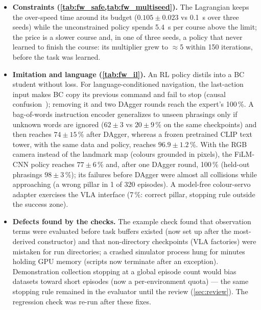 \begin{itemize}
faster than a tuned potential field, which is, however, more reliable (100 vs $89.6\pm2.4$\,\% group success). The potential field's
gains were selected on the training scenario after its first setting failed (0\,\%, 53\,\% collisions).
\item \textbf{Constraints (\cref{tab:fw_safe,tab:fw_multiseed}).} The Lagrangian keeps the over-speed time around its
budget ($0.105\pm0.023$ vs \SI{0.1}{s} over three seeds) while the unconstrained policy spends \SI{5.4}{s} per course
above the limit; the price is a slower course and, in one of three seeds, a policy that never learned to finish the
course: its multiplier grew to $\approx$5 within 150 iterations, before the task was learned.
\item \textbf{Imitation and language (\cref{tab:fw_il}).} An RL policy distils into a BC student without loss. For
language-conditioned navigation, the last-action input makes BC copy its previous command and fail to stop (causal
confusion~\cite{dehaan2019causal}); removing it and two DAgger rounds reach the expert's 100\,\%. A bag-of-words
instruction encoder generalizes to unseen phrasings only if unknown words are ignored ($62\pm3$ vs $20\pm9$\,\% on the
same checkpoints) and then reaches $74\pm15$\,\% after DAgger, whereas a frozen pretrained CLIP text tower, with the
same data and policy, reaches $96.9\pm1.2$\,\%. With the RGB camera instead of the
landmark map (colours grounded in pixels), the FiLM-CNN policy reaches $77\pm6$\,\% and, after one DAgger round,
100\,\% (held-out phrasings $98\pm3$\,\%); its failures before DAgger were almost all collisions while approaching
(a wrong pillar in 1 of 320 episodes). A model-free colour-servo adapter exercises the VLA interface (7\,\%: correct
pillar, stopping rule outside the success zone).
\item \textbf{Defects found by the checks.} The example check found that observation terms were evaluated before
task buffers existed (now set up after the most-derived constructor) and that non-directory checkpoints (VLA
factories) were mistaken for run directories; a crashed simulator process hung for minutes holding GPU memory
(scripts now terminate after an exception). Demonstration collection stopping at a global episode count would bias
datasets toward short episodes (now a per-environment quota) --- the same stopping rule remained in the evaluator until
the review (\cref{sec:review}). The regression check was re-run after these fixes.
\end{itemize}

